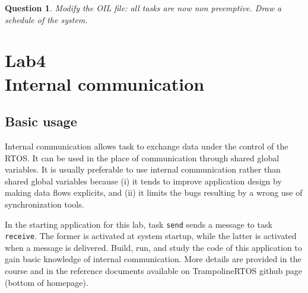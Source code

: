 \documentclass[11pt]{report}
\newtheorem{ex}{Question}
\begin{document}
\begin{ex}
  Modify the OIL file: all tasks are now non preemptive. Draw a schedule of the system.
\end{ex}


%

\chapter{Lab4\\Internal communication}

\section{Basic usage}

Internal communication allows task to exchange data under the control of the RTOS.
It can be used in the place of communication through shared global variables.
It is usually preferable to use internal communication rather than shared global variables because (i) it tends to improve application design by making data flows explicits, and (ii) it limits the bugs resulting by a wrong use of synchronization tools.

In the starting application for this lab, task \verb|send| sends a message to task \verb|receive|.
The former is activated at system startup, while the latter is activated when a message is delivered.
Build, run, and study the code of this application to gain basic knowledge of internal communication.
More details are provided in the course and in the reference documents available on TrampolineRTOS github page (bottom of homepage).
\end{document}
